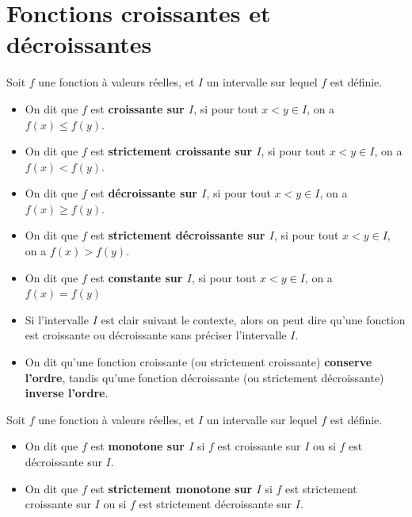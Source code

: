 \documentclass{article}
\begin{document}
\section{Fonctions croissantes et décroissantes}
\begin{tcolorbox}
\begin{definition}
Soit $f$ une fonction à valeurs réelles, et $I$ un intervalle sur lequel $f$ est définie.
\begin{itemize}
\item On dit que $f$ est \textbf{croissante sur $I$}, si pour tout $x < y \in I$, on a $f(x) \leq f(y)$.  
\item On dit que $f$ est \textbf{strictement croissante sur $I$}, si pour tout $x < y \in I$, on a $f(x) < f(y)$.  
\item On dit que $f$ est \textbf{décroissante sur $I$}, si pour tout $x < y \in I$, on a $f(x) \geq f(y)$.  
\item On dit que $f$ est \textbf{strictement décroissante sur $I$}, si pour tout $x < y \in I$, on a $f(x) > f(y)$.
\item On dit que $f$ est \textbf{constante sur $I$}, si pour tout $x < y \in I$, on a $f(x) = f(y)$
\end{itemize}
\end{definition}
\end{tcolorbox}
\begin{remark}
\hfill
\begin{itemize}
\item Si l'intervalle $I$ est clair suivant le contexte, alors on peut dire qu'une fonction est croissante ou décroissante sans préciser l'intervalle $I$.
\item On dit qu'une fonction croissante (ou strictement croissante) \textbf{conserve l'ordre}, tandis qu'une fonction décroissante (ou strictement décroissante) \textbf{inverse l'ordre}.
\end{itemize}
\end{remark}
\begin{definition}
Soit $f$ une fonction à valeurs réelles, et $I$ un intervalle sur lequel $f$ est définie. 
\begin{itemize}
\item On dit que $f$ est \textbf{monotone sur $I$} si $f$ est croissante sur $I$ ou si $f$ est décroissante sur $I$.
\item On dit que $f$ est \textbf{strictement monotone sur $I$} si $f$ est strictement croissante sur $I$ ou si $f$ est strictement décroissante sur $I$.
\end{itemize}
\end{definition}
\end{document}
